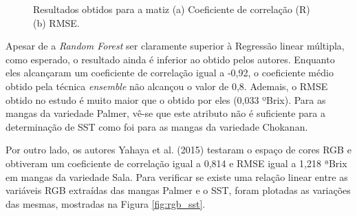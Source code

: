 \begin{figure}[H]
\centering
	\caption{Resultados obtidos para a matiz (a) Coeficiente de correlação (R) (b) RMSE.}
	\label{fig:fold_sst_hue}
\end{figure}

Apesar de a \textit{Random Forest} ser claramente superior à Regressão linear múltipla, como esperado, o resultado ainda é inferior ao obtido pelos autores. Enquanto eles alcançaram um coeficiente de correlação igual a -0,92, o coeficiente médio obtido pela técnica \textit{ensemble} não alcançou o valor de 0,8. Ademais, o RMSE obtido no estudo é muito maior que o obtido por eles (0,033 ºBrix). Para as mangas da variedade Palmer, vê-se que este atributo não é suficiente para a determinação de SST como foi para as mangas da variedade Chokanan.

Por outro lado, os autores Yahaya et al. (2015) testaram o espaço de cores RGB e obtiveram um coeficiente de correlação igual a 0,814 e RMSE igual a 1,218 ªBrix em mangas da variedade Sala. Para verificar se existe uma relação linear entre as variáveis RGB extraídas das mangas Palmer e o SST, foram plotadas as variações das mesmas, mostradas na Figura \ref{fig:rgb_sst}.

